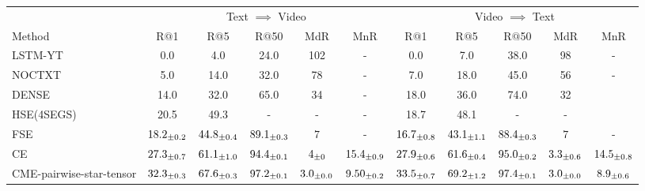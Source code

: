 \begin{table*}[h]
\centering 
\footnotesize 
\setlength{\tabcolsep}{5pt}
\begin{tabular}{l | c c c c c | c c c c c} 
\hline \hline 
\multicolumn{1}{c}{} & 
\multicolumn{5}{c}{Text $\implies$ Video} & \multicolumn{5}{c}{Video $\implies$ Text} \\
Method & R$@$1 & R$@$5 & R$@$50 & MdR & MnR & R$@$1 & R$@$5 & R$@$50 & MdR & MnR \\ 
\hline 
LSTM-YT & 0.0 & 4.0 & 24.0 & 102 & - & 0.0 & 7.0 & 38.0  & 98 & - \\
NOCTXT & 5.0 & 14.0 & 32.0 & 78 & - & 7.0 & 18.0 & 45.0 & 56 & - \\

DENSE & 14.0 & 32.0 & 65.0 & 34 & - & 18.0 & 36.0 & 74.0 & 32 \\
HSE(4SEGS) & 20.5 & 49.3 & - & - & - & 18.7 & 48.1 & - & - \\
FSE & $ 18.2_{\pm0.2}$ & $ 44.8_{\pm0.4}$ & $ {89.1}_{\pm 0.3}$ & $7$ & - & $ {16.7}_{\pm0.8}$ & $ {43.1}_{\pm1.1}$ & $ 88.4_{\pm0.3}$ & $7$ &  - \\
CE & $ 27.3_{\pm0.7}$ & $ 61.1_{\pm1.0}$ & $ 94.4_{\pm0.1}$ & $ 4_{\pm0}$ & $ 15.4_{\pm0.9}$ 
& $ 27.9_{\pm0.6}$ & $ 61.6_{\pm0.4}$ & $ 95.0_{\pm0.2}$ & $ 3.3_{\pm0.6}$ & $ 14.5_{\pm0.8}$ \\
\hline
CME-pairwise-star-tensor & $ 32.3_{\pm0.3}$ & $ 67.6_{\pm0.3}$ & $ 97.2_{\pm0.1}$ & $ 3.0_{\pm0.0}$ & $ 9.50_{\pm0.2}$ & $ 33.5_{\pm0.7}$ & $ 69.2_{\pm1.2}$ & $ 97.4_{\pm0.1}$ & $ 3.0_{\pm0.0}$ & $ 8.9_{\pm0.6}$ \\

\end{tabular}
\end{table*}
